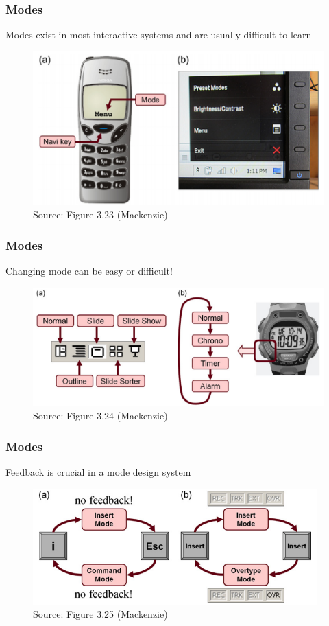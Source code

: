 \documentclass{beamer}
\begin{document}
\begin{frame}
	\frametitle{Modes}
	Modes exist in most interactive systems and are usually difficult to learn
	\begin{figure}
		\includegraphics[width=0.9\linewidth]{image/3-23}
		\caption{Source: Figure 3.23 (Mackenzie)}
	\end{figure}
\end{frame}

\begin{frame}
	\frametitle{Modes}
	Changing mode can be easy or difficult!
	\begin{figure}
		\includegraphics[width=0.9\linewidth]{image/3-24}
		\caption{Source: Figure 3.24 (Mackenzie)}
	\end{figure}
\end{frame}

\begin{frame}
	\frametitle{Modes}
	Feedback is crucial in a mode design system
	\begin{figure}
		\includegraphics[width=0.9\linewidth]{image/3-25}
		\caption{Source: Figure 3.25 (Mackenzie)}
	\end{figure}
\end{frame}
\end{document}
